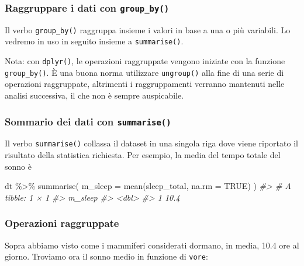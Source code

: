 \documentclass[
  10pt,
  italian,
  a4paper,
  extrafontsizes,onecolumn,openright
  ]{memoir}
\newenvironment{Shaded}{\begin{snugshade}}{\end{snugshade}}
\newcommand{\AttributeTok}[1]{\textcolor[rgb]{0.77,0.63,0.00}{#1}}
\newcommand{\CommentTok}[1]{\textcolor[rgb]{0.56,0.35,0.01}{\textit{#1}}}
\newcommand{\ConstantTok}[1]{\textcolor[rgb]{0.00,0.00,0.00}{#1}}
\newcommand{\FunctionTok}[1]{\textcolor[rgb]{0.00,0.00,0.00}{#1}}
\newcommand{\NormalTok}[1]{#1}
\newcommand{\SpecialCharTok}[1]{\textcolor[rgb]{0.00,0.00,0.00}{#1}}
\begin{document}
\hypertarget{raggruppare-i-dati-con-group_by}{%
\subsubsection{\texorpdfstring{Raggruppare i dati con \texttt{group\_by()}}{Raggruppare i dati con group\_by()}}\label{raggruppare-i-dati-con-group_by}}

Il verbo \texttt{group\_by()} raggruppa insieme i valori in base a una o più variabili. Lo vedremo in uso in seguito insieme a \texttt{summarise()}.

Nota: con \texttt{dplyr()}, le operazioni raggruppate vengono iniziate con la funzione \texttt{group\_by()}. È una buona norma utilizzare \texttt{ungroup()} alla fine di una serie di operazioni raggruppate, altrimenti i raggruppamenti verranno mantenuti nelle analisi successiva, il che non è sempre auspicabile.

\hypertarget{sommario-dei-dati-con-summarise}{%
\subsubsection{\texorpdfstring{Sommario dei dati con \texttt{summarise()}}{Sommario dei dati con summarise()}}\label{sommario-dei-dati-con-summarise}}

Il verbo \texttt{summarise()} collassa il dataset in una singola riga dove viene riportato il risultato della statistica richiesta. Per esempio, la media del tempo totale del sonno è

\begin{Shaded}
\begin{Highlighting}[]
\NormalTok{dt }\SpecialCharTok{\%\textgreater{}\%} 
  \FunctionTok{summarise}\NormalTok{(}
    \AttributeTok{m\_sleep =} \FunctionTok{mean}\NormalTok{(sleep\_total, }\AttributeTok{na.rm =} \ConstantTok{TRUE}\NormalTok{)}
\NormalTok{  ) }
\CommentTok{\#\textgreater{} \# A tibble: 1 × 1}
\CommentTok{\#\textgreater{}   m\_sleep}
\CommentTok{\#\textgreater{}     \textless{}dbl\textgreater{}}
\CommentTok{\#\textgreater{} 1    10.4}
\end{Highlighting}
\end{Shaded}

\hypertarget{operazioni-raggruppate}{%
\subsubsection{Operazioni raggruppate}\label{operazioni-raggruppate}}

Sopra abbiamo visto come i mammiferi considerati dormano, in media, 10.4 ore al giorno. Troviamo ora il sonno medio in funzione di \texttt{vore}:
\end{document}
